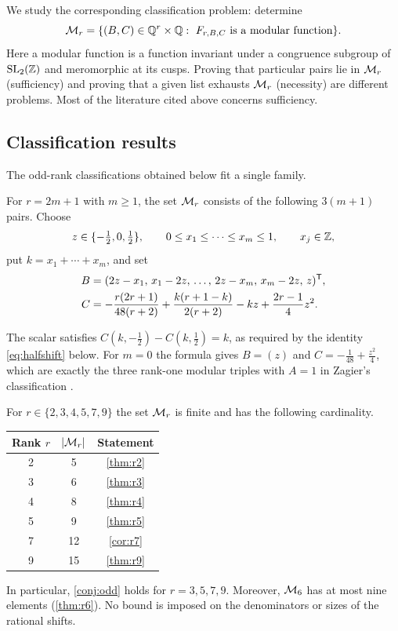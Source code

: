 We study the corresponding classification problem: determine
\[
\mathcal{M}_r=\{(B,C)\in\mathbb{Q}^r\times\mathbb{Q}:\ F_{r,B,C}\ \text{is a modular function}\}.
\]
Here a modular function is a function invariant under a congruence subgroup of $\mathrm{SL}_2(\mathbb{Z})$ and meromorphic at its cusps. Proving that particular pairs lie in $\mathcal{M}_r$ (sufficiency) and proving that a given list exhausts $\mathcal{M}_r$ (necessity) are different problems. Most of the literature cited above concerns sufficiency.

\subsection{Classification results}
The odd-rank classifications obtained below fit a single family.

\begin{conjecture}\label{conj:odd}
For $r=2m+1$ with $m\ge1$, the set $\mathcal{M}_r$ consists of the following $3(m+1)$ pairs. Choose
\[
z\in\{-\tfrac12,0,\tfrac12\},\qquad 0\le x_1\le\cdots\le x_m\le1,\qquad x_j\in\mathbb{Z},
\]
put $k=x_1+\cdots+x_m$, and set
\begin{align*}
B&=(2z-x_1,\,x_1-2z,\,\dots,\,2z-x_m,\,x_m-2z,\,z)^{\mathsf{T}},\\
C&=-\frac{r(2r+1)}{48(r+2)}+\frac{k(r+1-k)}{2(r+2)}-kz+\frac{2r-1}{4}z^2.
\end{align*}
\end{conjecture}

The scalar satisfies $C(k,-\tfrac12)-C(k,\tfrac12)=k$, as required by the identity \eqref{eq:halfshift} below. For $m=0$ the formula gives $B=(z)$ and $C=-\tfrac1{48}+\tfrac{z^2}4$, which are exactly the three rank-one modular triples with $A=1$ in Zagier's classification \cite{Zagier07}.

\begin{theorem}\label{thm:main-class}
For $r\in\{2,3,4,5,7,9\}$ the set $\mathcal{M}_r$ is finite and has the following cardinality.
\begin{center}
\begin{tabular}{ccc}
\toprule
Rank $r$ & $|\mathcal{M}_r|$ & Statement\\
\midrule
2 & 5 & \cref{thm:r2}\\
3 & 6 & \cref{thm:r3}\\
4 & 8 & \cref{thm:r4}\\
5 & 9 & \cref{thm:r5}\\
7 & 12 & \cref{cor:r7}\\
9 & 15 & \cref{thm:r9}\\
\bottomrule
\end{tabular}
\end{center}
In particular, \cref{conj:odd} holds for $r=3,5,7,9$. Moreover, $\mathcal{M}_6$ has at most nine elements (\cref{thm:r6}). No bound is imposed on the denominators or sizes of the rational shifts.
\end{theorem}

